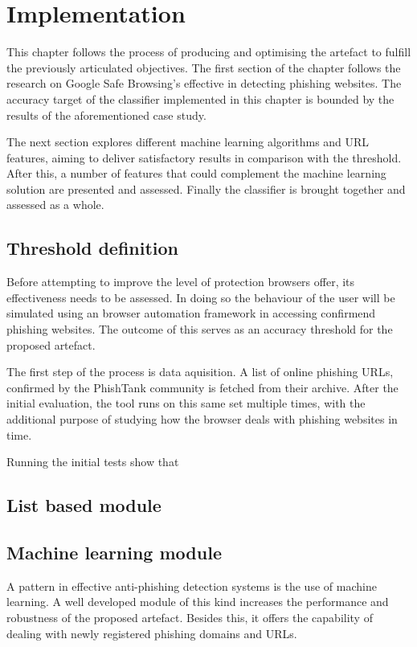 
\chapter{Implementation}
This chapter follows the process of producing and optimising the artefact to fulfill the previously articulated objectives. The first section of the chapter follows the research on Google Safe Browsing's effective in detecting phishing websites. The accuracy target of the classifier implemented in this chapter is bounded by the results of the aforementioned case study. 

The next section explores different machine learning algorithms and URL features, aiming to deliver satisfactory results in comparison with the threshold. After this, a number of features that could complement the machine learning solution are presented and assessed. Finally the classifier is brought together and assessed as a whole.

\section{Threshold definition}
Before attempting to improve the level of protection browsers offer, its effectiveness needs to be assessed. In doing so the behaviour of the user will be simulated using an browser automation framework in accessing confirmend phishing websites. The outcome of this serves as an accuracy threshold for the proposed artefact.

The first step of the process is data aquisition. A list of online phishing URLs, confirmed by the PhishTank community is fetched from their archive. After the initial evaluation, the tool runs on this same set multiple times, with the additional purpose of studying how the browser deals with phishing websites in time.

Running the initial tests show that 
\section{List based module}

\section{Machine learning module}
A pattern in effective anti-phishing detection systems is the use of machine learning. A well developed module of this kind increases the performance and robustness of the proposed artefact. Besides this, it offers the capability of dealing with newly registered phishing domains and URLs.

